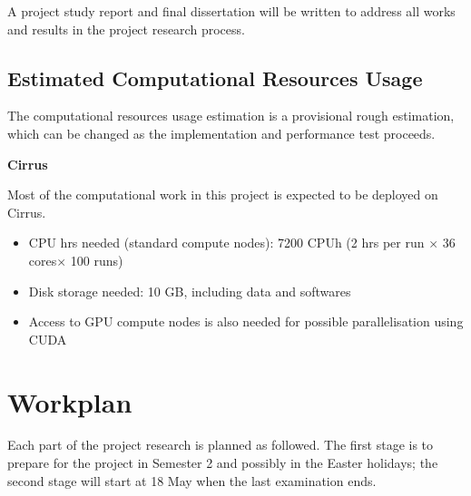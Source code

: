 \documentclass{article}
\begin{document}
A project study report and final dissertation will be written to address all works and results in the project research process.

\subsection{Estimated Computational Resources Usage}

The computational resources usage estimation is a provisional rough estimation, 
which can be changed as the implementation and performance test proceeds.

\textbf{Cirrus}

Most of the computational work in this project is expected to be deployed on Cirrus.
\begin{itemize}
	\item CPU hrs needed (standard compute nodes): 7200 CPUh (2 hrs per run $\times$ 
	36 cores$\times$ 100 runs)
	\item Disk storage needed: 10 GB, including data and softwares
	\item Access to GPU compute nodes is also needed for possible parallelisation using CUDA
\end{itemize}

\section{Workplan}

Each part of the project research is planned as followed. The first stage is to prepare for the project in Semester 2 and possibly in the Easter holidays; the second stage will start at 18 May when the last examination ends.
\end{document}
